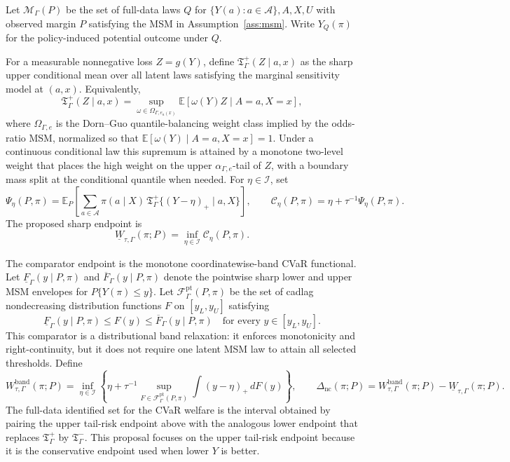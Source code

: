 \documentclass[11pt]{article}
\newcommand{\E}{\mathbb{E}}
\theoremstyle{definition}
\theoremstyle{plain}
\theoremstyle{remark}
\begin{document}
Let \(\mathcal M_\Gamma(P)\) be the set of full-data laws \(Q\) for \(\{Y(a):a\in\mathcal A\},A,X,U\) with observed margin \(P\) satisfying the MSM in Assumption~\ref{ass:msm}.  Write \(Y_Q(\pi)\) for the policy-induced potential outcome under \(Q\).

For a measurable nonnegative loss \(Z=g(Y)\), define \(\mathfrak T_\Gamma^+(Z\mid a,x)\) as the sharp upper conditional mean over all latent laws satisfying the marginal sensitivity model at \((a,x)\).  Equivalently,
\[
\mathfrak T_\Gamma^+(Z\mid a,x)
=
\sup_{\omega\in\Omega_{\Gamma,e_a(x)}} \E[\omega(Y)Z\mid A=a,X=x],
\]
where \(\Omega_{\Gamma,e}\) is the Dorn--Guo quantile-balancing weight class implied by the odds-ratio MSM, normalized so that \(\E[\omega(Y)\mid A=a,X=x]=1\).  Under a continuous conditional law this supremum is attained by a monotone two-level weight that places the high weight on the upper \(\alpha_{\Gamma,e}\)-tail of \(Z\), with a boundary mass split at the conditional quantile when needed.  For \(\eta\in\mathcal I\), set
\[
\Psi_\eta(P,\pi)
=
\E_P\left[
\sum_{a\in\mathcal A}\pi(a\mid X)\,
\mathfrak T_\Gamma^+\{(Y-\eta)_+\mid a,X\}
\right],
\qquad
\mathcal C_\eta(P,\pi)
=
\eta+\tau^{-1}\Psi_\eta(P,\pi).
\]
The proposed sharp endpoint is
\[
\underline W_{\tau,\Gamma}(\pi;P)
=
\inf_{\eta\in\mathcal I}\mathcal C_\eta(P,\pi).
\]

The comparator endpoint is the monotone coordinatewise-band CVaR functional.  Let \(\underline F_{\Gamma}(y\mid P,\pi)\) and \(\overline F_{\Gamma}(y\mid P,\pi)\) denote the pointwise sharp lower and upper MSM envelopes for \(P\{Y(\pi)\leq y\}\).  Let \(\mathcal F_{\Gamma}^{\mathrm{pt}}(P,\pi)\) be the set of cadlag nondecreasing distribution functions \(F\) on \([y_L,y_U]\) satisfying
\[
\underline F_{\Gamma}(y\mid P,\pi)\leq F(y)\leq
\overline F_{\Gamma}(y\mid P,\pi)
\quad\text{for every }y\in[y_L,y_U].
\]
This comparator is a distributional band relaxation: it enforces monotonicity and right-continuity, but it does not require one latent MSM law to attain all selected thresholds.  Define
\[
W_{\tau,\Gamma}^{\mathrm{band}}(\pi;P)
=
\inf_{\eta\in\mathcal I}
\left\{\eta+\tau^{-1}\sup_{F\in\mathcal F_{\Gamma}^{\mathrm{pt}}(P,\pi)}
\int (y-\eta)_+\,dF(y)\right\},
\qquad
\Delta_{\mathrm{nc}}(\pi;P)=W_{\tau,\Gamma}^{\mathrm{band}}(\pi;P)
-\underline W_{\tau,\Gamma}(\pi;P).
\]
The full-data identified set for the CVaR welfare is the interval obtained by pairing the upper tail-risk endpoint above with the analogous lower endpoint that replaces \(\mathfrak T_\Gamma^+\) by \(\mathfrak T_\Gamma^-\).  This proposal focuses on the upper tail-risk endpoint because it is the conservative endpoint used when lower \(Y\) is better.
\end{document}
